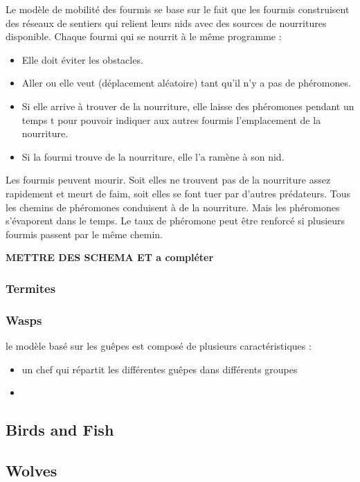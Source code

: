 Le modèle de mobilité des fourmis se base sur le fait que les fourmis construisent des réseaux de sentiers qui relient leurs   nids avec des sources de nourritures disponible.
Chaque fourmi qui se nourrit à le même programme :

\begin{itemize}
\item Elle doit éviter les obstacles.
\item Aller ou elle veut (déplacement aléatoire) tant qu'il n'y a pas de phéromones.
\item Si elle arrive à trouver de la nourriture, elle laisse des phéromones pendant un temps t pour pouvoir indiquer aux autres fourmis l'emplacement de la nourriture.
\item Si la fourmi trouve de la nourriture, elle l'a ramène à son nid.
\end{itemize}

Les fourmis peuvent mourir. Soit elles ne trouvent pas de la nourriture assez rapidement et meurt de faim, soit elles se font tuer par d'autres prédateurs.
Tous les chemins de phéromones conduisent à de la nourriture. Mais les phéromones s'évaporent dans le temps. Le taux de phéromone peut être renforcé si plusieurs fourmis passent par le même chemin.

\textbf{METTRE DES SCHEMA ET a compléter}

\subsubsection{Termites}

\subsubsection{Wasps}

le modèle basé sur les guêpes est composé de plusieurs caractéristiques :
\begin{itemize}
\item un chef qui répartit les différentes guêpes dans différents groupes
\item 
\end{itemize}

\subsection{Birds and Fish}

\subsection{Wolves}

 